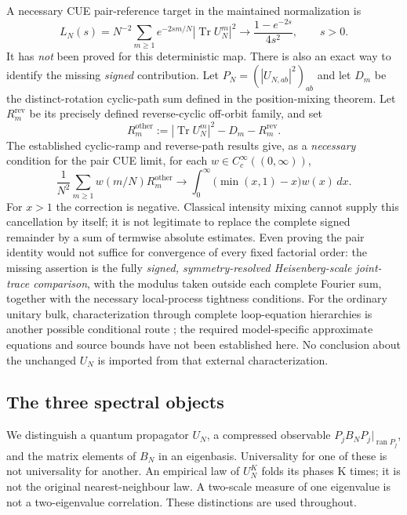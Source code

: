 A necessary CUE pair-reference target in the maintained normalization is
\begin{equation}
 L_N(s)=N^{-2}\sum_{m\ge1}e^{-2sm/N}
       |\operatorname{Tr}U_N^m|^2
 \longrightarrow \frac{1-e^{-2s}}{4s^2},
 \qquad s>0.
 \label{eq:frozen-pair-abel-introduction}
\end{equation}
It has \emph{not} been proved for this deterministic map. There
is also an exact way to identify the missing \emph{signed} contribution.
Let $P_N=(|U_{N,ab}|^2)_{ab}$ and let $D_m$ be the
distinct-rotation cyclic-path sum defined in the position-mixing theorem.
Let $R_m^{\mathrm{rev}}$ be its precisely defined reverse-cyclic
off-orbit family, and set
\[
 R_m^{\mathrm{other}}
 :=|\operatorname{Tr}U_N^m|^2-D_m-R_m^{\mathrm{rev}}.
\]
The established cyclic-ramp and reverse-path results give, as a
\emph{necessary} condition for the pair CUE limit, for each
$w\in C_c^\infty((0,\infty))$,
\begin{equation}
 \frac{1}{N^2}\sum_{m\ge1}w(m/N)R_m^{\mathrm{other}}
 \longrightarrow
 \int_0^\infty\bigl(\min(x,1)-x\bigr)w(x)\,dx.
 \label{eq:frozen-signed-remainder-introduction}
\end{equation}
For $x>1$ the correction is negative. Classical intensity mixing
cannot supply this cancellation by itself; it is not legitimate to
replace the complete signed remainder by a sum of termwise absolute
estimates. Even proving the pair identity would not suffice for
convergence of every fixed
factorial order: the missing assertion is the fully
\emph{signed, symmetry-resolved Heisenberg-scale joint-trace
comparison}, with the modulus taken outside each complete Fourier
sum, together with the necessary local-process tightness conditions.
For the ordinary unitary bulk, characterization through complete
loop-equation hierarchies is another possible conditional route
\cite{BH2026}; the required model-specific approximate equations
and source bounds have not been established here. No conclusion about
the unchanged $U_N$ is imported from that external characterization.

\subsection{The three spectral objects}
We distinguish a quantum propagator $U_N$, a compressed observable
$P_jB_NP_j|_{\operatorname{ran}P_j}$, and the matrix elements of $B_N$ in an
eigenbasis. Universality for one of these is not universality for another.
An empirical law of $U_N^K$ folds its phases K times; it is not the original
nearest-neighbour law. A two-scale measure of one eigenvalue is not a
two-eigenvalue correlation. These distinctions are used throughout.

